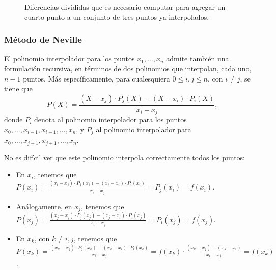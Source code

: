 \begin{figure}[H]
\begin{center}
\end{center}

\label{dif-divididas}
\caption{Diferencias divididas que es necesario computar para agregar un
cuarto punto a un conjunto de tres puntos ya interpolados.}
\end{figure}

\subsubsection{Método de Neville}

El polinomio interpolador para los puntos $x_1, \dots, x_n$ admite
también una formulación recursiva, en términos de dos polinomios que
interpolan, cada uno, $n-1$ puntos. Más específicamente, para cualesquiera
$0 \leq i,j \leq n$, con $i \neq j$, se tiene que
\[ P(X) = \frac{(X - x_j) \cdot P_j(X)
    - (X - x_i) \cdot P_i(X)}{x_i - x_j}, \]
donde $P_i$ denota al polinomio interpolador para los puntos
$x_0,\dots,x_{i-1},x_{i+1},\dots,x_n$, y $P_j$ al polinomio interpolador para
$x_0,\dots,x_{j-1},x_{j+1},\dots,x_n$.

No es difícil ver que este polinomio interpola correctamente todos los puntos:
\begin{itemize}
\item En $x_i$, tenemos que $P(x_i)
    = \frac{(x_i - x_j) \cdot P_j(x_i) - (x_i - x_i) \cdot P_i(x_i)}{x_i - x_j}
    = P_j(x_i) = f(x_i)$.
\item Análogamente, en $x_j$, tenemos que $P(x_j)
    = \frac{(x_j - x_j) \cdot P_j(x_j) - (x_j - x_i) \cdot P_i(x_j)}{x_i - x_j}
    = P_i(x_j) = f(x_j)$.
\item En $x_k$, con $k \neq i, j$, tenemos que $P(x_k)
    = \frac{(x_k - x_j) \cdot P_j(x_k) - (x_k - x_i) \cdot P_i(x_k)}{x_i - x_j}
    = f(x_k) \cdot \frac{(x_k - x_j) - (x_k - x_i)}{x_i - x_j} = f(x_k)$.
\end{itemize}

